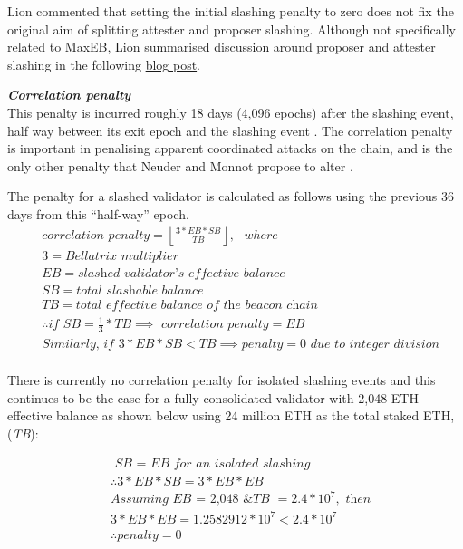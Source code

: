 Lion commented that setting the initial slashing penalty to zero does not fix the original aim of splitting attester and proposer slashing.  Although not specifically related to MaxEB, Lion summarised discussion around proposer and attester slashing in the following \href{https://docs.google.com/document/d/1mOc5nokVm3jx4bCffTuQ_xjYV4zVlDLPI-KEhFWWP78/edit}{blog post}.

\noindent
\textbf{\textit{Correlation penalty}} \\
This penalty is incurred roughly 18 days (4,096 epochs) after the slashing event, half way between its exit epoch and the slashing event \cite{Edgington2023}. The correlation penalty is important in penalising apparent coordinated attacks on the chain, and is the only other penalty that Neuder and Monnot propose to alter \cite{Neuder2023d}.

The penalty for a slashed validator is calculated as follows using the previous 36 days from this ``half-way'' epoch.
\begin{equation*}
\begin{split}
& \textit{correlation penalty} = \left\lfloor \frac{3*EB*SB}{TB} \right\rfloor, \texttt{ } where \\
& 3 = \textit{Bellatrix multiplier} \\
& EB = \textit{slashed validator's effective balance} \\
& SB = \textit{total slashable balance} \\
& TB = \textit{total effective balance of the beacon chain} \\
& \therefore \textit{if SB} = \frac{1}{3} * TB \implies \textit{ correlation penalty} = EB \\
& \textit{Similarly, if } 3*EB*SB <  TB \implies penalty = 0 \textit{ due to integer division} \\
\end{split}
\end{equation*}

There is currently no correlation penalty for isolated slashing events and this continues to be the case for a fully consolidated validator with 2,048 ETH effective balance as shown below using 24 million ETH as the total staked ETH, (\textit{TB}):

\begin{equation*}
\begin{split}
& \textit{ SB = EB for an isolated slashing} \\
& \therefore  3*EB*SB =  3*EB*EB \\
& \textit{Assuming EB = 2,048 \& TB } = 2.4 * 10^7, \textit{ then} \\
& 3*EB*EB = 1.2582912 * 10^7 < 2.4 * 10^7 \\
& \therefore penalty = 0
\end{split}
\end{equation*}

